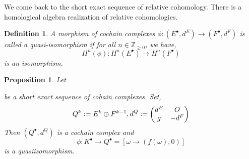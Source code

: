 \documentclass[10pt]{article}
\newtheorem{proposition}{Proposition}[section]
\newtheorem{definition}{Definition}[section]
\newcommand{\defeq}{\vcentcolon=}
\newcommand{\Z}[0]{\mathbb{Z}}
\begin{document}
We come back to the short exact sequence of relative cohomology. There is a homological algebra realization of relative cohomologies.
\begin{definition}
  A morphism of cochain complexes $\phi:(E^\bullet,d^E)\to(F^\bullet,d^F)$ is called a quasi-isomorphism if for all $n\in\Z_{\geq0}$, we have,
  \begin{equation*}
    H^n(\phi):H^n(E^\bullet)\to H^n(F^\bullet)
  \end{equation*}
  is an isomorphism.
\end{definition}
\begin{proposition}
  Let 
  \begin{center}
  \end{center}
  be a short exact sequence of cohain complexes. Set,
  \begin{equation*}
    Q^k \defeq E^k\oplus F^{k-1}, d^Q\defeq  \begin{pmatrix}
      d^E & O\\
      g & -d^F
    \end{pmatrix}
  \end{equation*}
  Then $(Q^\bullet,d^Q)$ is a cochain complex and 
  \begin{equation*}
    \phi:K^\bullet\to Q^\bullet = [\omega\to(f(\omega),0)]
  \end{equation*}
  is a quasiisomorphism.
  \label{proposition_extension_cochain_complexes}
\end{proposition}
\end{document}
